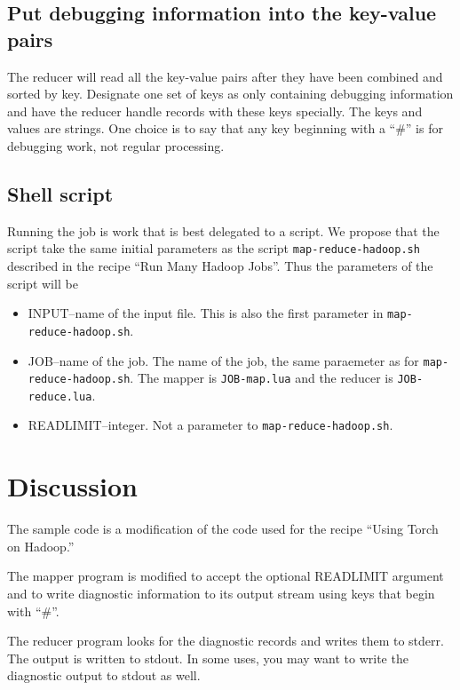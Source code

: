 \documentclass{article}
\let\code\texttt %
\begin{document}
\subsection{Put debugging information into the key-value pairs}

The reducer will read all the key-value pairs after they have been
combined and sorted by key. Designate one set of keys as only containing
debugging information and have the reducer handle records with these
keys specially. The keys and values are strings. One choice is to say
that any key beginning with a ``\#'' is for debugging work, not regular
processing.

\subsection{Shell script}

Running the job is work that is best delegated to a script. We propose
that the script take the same initial parameters as the script
\code{map-reduce-hadoop.sh} described in the recipe ``Run Many Hadoop
Jobs''. Thus the parameters of the script will be
\begin{itemize}
  \item INPUT--name of the input file. This is also the first parameter
    in \code{map-reduce-hadoop.sh}.
  \item JOB--name of the job. The name of the job, the same paraemeter
    as for \code{map-reduce-hadoop.sh}. The mapper is \code{JOB-map.lua}
    and the reducer is \code{JOB-reduce.lua}.
  \item READLIMIT--integer. Not a parameter to
    \code{map-reduce-hadoop.sh}. 
\end{itemize}


\section{Discussion}

The sample code is a modification of the code used for the recipe
``Using Torch on Hadoop.''

The mapper program is modified to accept the optional READLIMIT
argument and to write diagnostic information to its output stream using
keys that begin with ``\#''.



The reducer program looks for the diagnostic records and writes them to
stderr. The output is written to stdout. In some uses, you may want to
write the diagnostic output to stdout as well.
\end{document}
